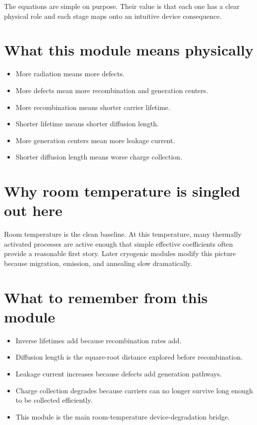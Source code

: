 \documentclass[11pt]{article}
\begin{document}
The equations are simple on purpose. Their value is that each one has a clear physical role and each stage maps onto an intuitive device consequence.

\section{What this module means physically}
\begin{itemize}
    \item More radiation means more defects.
    \item More defects mean more recombination and generation centers.
    \item More recombination means shorter carrier lifetime.
    \item Shorter lifetime means shorter diffusion length.
    \item More generation centers mean more leakage current.
    \item Shorter diffusion length means worse charge collection.
\end{itemize}

\section{Why room temperature is singled out here}
Room temperature is the clean baseline. At this temperature, many thermally activated processes are active enough that simple effective coefficients often provide a reasonable first story. Later cryogenic modules modify this picture because migration, emission, and annealing slow dramatically.

\section{What to remember from this module}
\begin{itemize}
    \item Inverse lifetimes add because recombination rates add.
    \item Diffusion length is the square-root distance explored before recombination.
    \item Leakage current increases because defects add generation pathways.
    \item Charge collection degrades because carriers can no longer survive long enough to be collected efficiently.
    \item This module is the main room-temperature device-degradation bridge.
\end{itemize}
\end{document}
